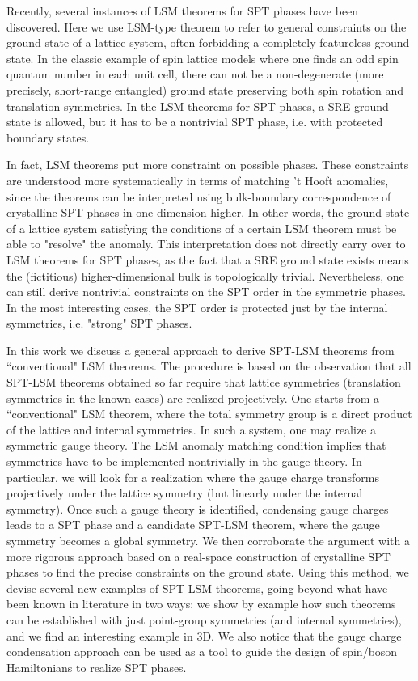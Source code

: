 \documentclass[reprint,amsmath,amssymb,aps,pra,]{revtex4-1}
\begin{document}
Recently, several instances of LSM theorems for SPT phases have been discovered.  
Here we use LSM-type theorem to refer to general constraints on the ground state of a lattice system, often forbidding a completely featureless ground state. 
In the classic example of spin lattice models where one finds an odd spin quantum number in each unit cell, there can not be a non-degenerate (more precisely, short-range entangled) ground state preserving both spin rotation and translation symmetries. 
In the LSM theorems for SPT phases, a SRE ground state is allowed, but it has to be a nontrivial SPT phase, i.e. with protected boundary states. 

In fact, LSM theorems put more constraint on possible phases. 
These constraints are understood more systematically in terms of matching 't Hooft anomalies, since the theorems can be interpreted using bulk-boundary correspondence of crystalline SPT phases in one dimension higher. 
In other words, the ground state of a lattice system satisfying the conditions of a certain LSM theorem must be able to "resolve" the anomaly. 
This interpretation does not directly carry over to LSM theorems for SPT phases, as the fact that a SRE ground state exists means the (fictitious) higher-dimensional bulk is topologically trivial. 
Nevertheless, one can still derive nontrivial constraints on the SPT order in the symmetric phases. In the most interesting cases, the SPT order is protected just by the internal symmetries, i.e. "strong" SPT phases.

In this work we discuss a general approach to derive SPT-LSM theorems from ``conventional" LSM theorems. The procedure is based on the observation that all SPT-LSM theorems obtained so far require that lattice symmetries (translation symmetries in the known cases) are realized projectively. One starts from a ``conventional" LSM theorem, where the total symmetry group is a direct product of the lattice and internal symmetries. In such a system, one may realize a symmetric gauge theory. The LSM anomaly matching condition implies that symmetries have to be implemented nontrivially in the gauge theory. In particular, we will look for a realization where the gauge charge transforms projectively under the lattice symmetry (but linearly under the internal symmetry). Once such a gauge theory is identified, condensing gauge charges leads to a SPT phase and a candidate SPT-LSM theorem, where the gauge symmetry becomes a global symmetry. We then corroborate the argument with a more rigorous approach based on a real-space construction of crystalline SPT phases to find the precise constraints on the ground state.  Using this method, we devise several new examples of SPT-LSM theorems, going beyond what have been known in literature in two ways: we show by example how such theorems can be established with just point-group symmetries (and internal symmetries), and we find an interesting example in 3D.
We also notice that the gauge charge condensation approach can be used as a tool to guide the design of spin/boson Hamiltonians to realize SPT phases.
\end{document}
